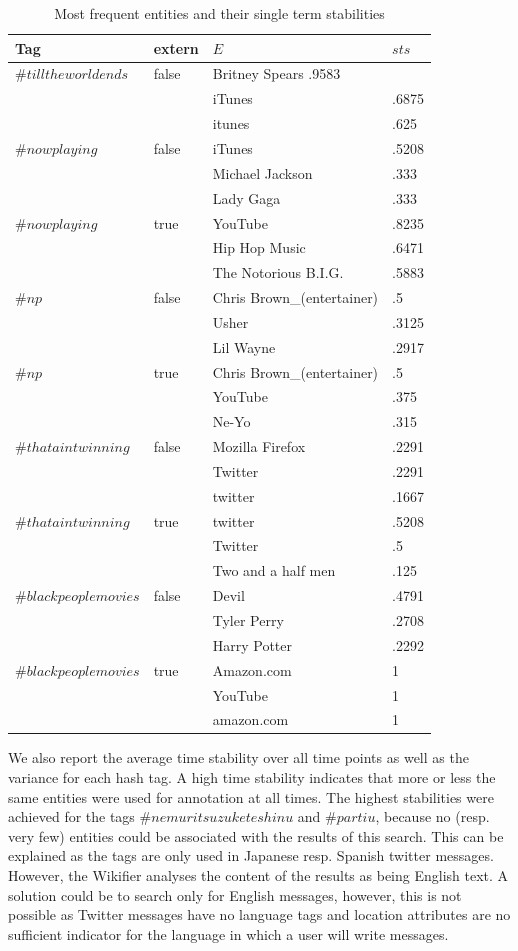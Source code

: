 \documentclass{llncs}
\begin{document}
\begin{table}[ht]
\centering
\begin{tabular}{l|l|l|l}
Tag & extern & $E$ & $sts$ \\%
\hline
$\#tilltheworldends$ & false & Britney Spears .9583 \\
& &  iTunes & .6875 \\
& &  itunes & .625 \\ 
$\#nowplaying$ & false & iTunes & .5208 \\
& & Michael Jackson & .333 \\
& & Lady Gaga & .333 \\
$\#nowplaying$ & true & YouTube & .8235 \\
& & Hip Hop Music & .6471 \\
& & The Notorious B.I.G. & .5883 \\
$\#np$ & false & Chris Brown\_(entertainer) & .5 \\
& & Usher & .3125 \\
& & Lil Wayne & .2917 \\
$\#np$ & true & Chris Brown\_(entertainer) & .5 \\
& & YouTube & .375 \\
& & Ne-Yo & .315 \\
$\#thataintwinning$ & false & Mozilla Firefox & .2291 \\
& & Twitter & .2291 \\
& & twitter & .1667 \\
$\#thataintwinning$ & true & twitter & .5208 \\
& & Twitter & .5 \\
& & Two and a half men & .125 \\
$\#blackpeoplemovies$ & false & Devil & .4791 \\
& & Tyler Perry & .2708 \\
& & Harry Potter & .2292 \\
$\#blackpeoplemovies$ & true & Amazon.com & 1 \\
& & YouTube & 1 \\
& & amazon.com & 1
\end{tabular}
\label{tbl:entities}
\caption{Most frequent entities and their single term stabilities}
\end{table}

We also report the average time stability over all time points as well as the variance for each hash tag. A high time stability indicates that more or less the same entities were used for annotation at all times. The highest stabilities were achieved for the tags $\#nemuritsuzuketeshinu$ and $\#partiu$, because no (resp. very few) entities could be associated with the results of this search. This can be explained as the tags are only used in Japanese resp. Spanish twitter messages. However, the Wikifier analyses the content of the results as being English text. A solution could be to search only for English messages, however, this is not possible as Twitter messages have no language tags and location attributes are no sufficient indicator for the language in which a user will write messages.
\end{document}
